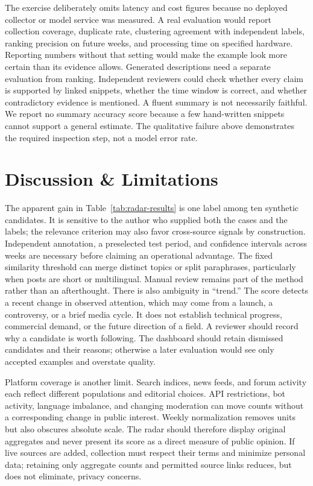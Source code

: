 \documentclass[../../proceedings/main.tex]{subfiles}
\begin{document}
\begin{refsection}
The exercise deliberately omits latency and cost figures because no deployed
collector or model service was measured. A real evaluation would report
collection coverage, duplicate rate, clustering agreement with independent
labels, ranking precision on future weeks, and processing time on specified
hardware. Reporting numbers without that setting would make the example look
more certain than its evidence allows.
Generated descriptions need a separate evaluation from ranking. Independent
reviewers could check whether every claim is supported by linked snippets,
whether the time window is correct, and whether contradictory evidence is
mentioned. A fluent summary is not necessarily faithful. We report no
summary accuracy score because a few hand-written snippets cannot support a
general estimate. The qualitative failure above demonstrates the required
inspection step, not a model error rate.

\section{Discussion \& Limitations}
The apparent gain in Table~\ref{tab:radar-results} is one label among ten
synthetic candidates. It is sensitive to the author who supplied both the
cases and the labels; the relevance criterion may also favor cross-source
signals by construction. Independent annotation, a preselected test period,
and confidence intervals across weeks are necessary before claiming an
operational advantage. The fixed similarity threshold can merge distinct
topics or split paraphrases, particularly when posts are short or multilingual.
Manual review remains part of the method rather than an afterthought.
There is also ambiguity in ``trend.'' The score detects a recent change in
observed attention, which may come from a launch, a controversy, or a brief
media cycle. It does not establish technical progress, commercial demand, or
the future direction of a field. A reviewer should record why a candidate is
worth following. The dashboard should retain dismissed candidates and their
reasons; otherwise a later evaluation would see only accepted examples and
overstate quality.

Platform coverage is another limit. Search indices, news feeds, and forum
activity each reflect different populations and editorial choices. API
restrictions, bot activity, language imbalance, and changing moderation can
move counts without a corresponding change in public interest. Weekly
normalization removes units but also obscures absolute scale. The radar should
therefore display original aggregates and never present its score as a direct
measure of public opinion. If live sources are added, collection must respect
their terms and minimize personal data; retaining only aggregate counts and
permitted source links reduces, but does not eliminate, privacy concerns.


\end{refsection}
\end{document}
